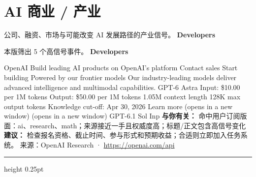 \documentclass[10.5pt]{ctexart}
\begin{document}
\section*{AI 商业 / 产业}
{\color{ormuted} 公司、融资、市场与可能改变 AI 发展路径的产业信号。}
\vspace{2mm}
{\LARGE\bfseries Developers}\par
\vspace{1mm}
{\color{ormuted} 本版筛出 5 个高信号事件。}
\vspace{3mm}
{\Large\bfseries Developers}\par
OpenAI Build leading AI products on OpenAI’s platform Contact sales Start building Powered by our frontier models Our industry-leading models deliver advanced intelligence and multimodal capabilities. GPT-6 Astra Input: \$10.00 per 1M tokens Output: \$50.00 per 1M tokens 1.05M context length 128K max output tokens Knowledge cut-off: Apr 30, 2026 Learn more (opens in a new window) (opens in a new window) GPT-6.1 Sol Inp
\textbf{与你有关：} 命中用户订阅版面：ai、research、math；来源接近一手且权威度高；标题/正文包含高信号变化
\textbf{建议：} 检查报名资格、截止时间、参与形式和预期收益；合适则立即加入任务系统。
{\footnotesize\color{ormuted} 来源：OpenAI Research · \url{https://openai.com/api}}
\vspace{4mm}
\hrule height 0.25pt
\vspace{3mm}
\end{document}
